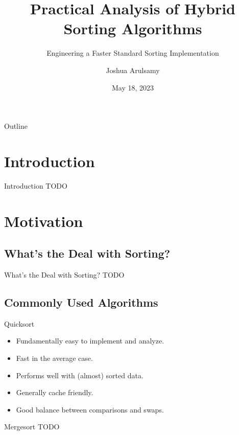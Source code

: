 \documentclass[13pt]{beamer}
\title{Practical Analysis of Hybrid Sorting Algorithms}
\subtitle{Engineering a Faster Standard Sorting Implementation}
\author{Joshua Arulsamy}
\date{May 18, 2023}
\begin{document}
\logo{}
\nocite{*}

\begin{frame}
	\titlepage
\end{frame}

\section{}
\subsection{}
\begin{frame}{Outline}
	\tableofcontents
\end{frame}

\section{Introduction}
\begin{frame}{Introduction}
	TODO
\end{frame}

\section{Motivation}
\subsection{What's the Deal with Sorting?}
\begin{frame}{What's the Deal with Sorting?}
	TODO
\end{frame}

\subsection{Commonly Used Algorithms}
\begin{frame}{Quicksort}
	\begin{itemize}
		\item Fundamentally easy to implement and analyze.
		\item Fast in the average case.
		\item Performs well with (almost) sorted data.
		\item Generally cache friendly.
		\item Good balance between comparisons and swaps.
	\end{itemize}
\end{frame}

\begin{frame}{Mergesort}
	TODO
\end{frame}
\end{document}
